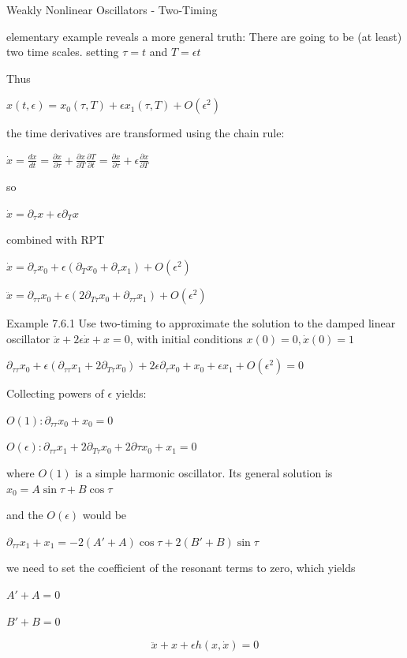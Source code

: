\documentclass[9pt,aspectratio=43,mathserif,table]{beamer}
\begin{document}
\begin{frame}[label=current]{Weakly Nonlinear Oscillators - Two-Timing}
  \begin{multicols}{2}
     elementary example reveals a more general truth: There are going to be (at least) two time scales. setting $\tau = t$ and $T = \epsilon t$

     Thus

     $x(t, \epsilon) = x_0 (\tau, T) + \epsilon x_1(\tau, T) + O(\epsilon^2)$

     the time derivatives are transformed using the chain rule:

     $\dot x = \frac{ dx}{dt} = \frac{ \partial x}{\partial \tau} + \frac{ \partial x}{\partial T} \frac{ \partial T}{\partial t} =  \frac{ \partial x}{\partial \tau} + \epsilon  \frac{ \partial x}{\partial T} $

     so

     $\dot x = \partial_\tau x + \epsilon \partial_T x$

     combined with RPT

     $\dot x = \partial_\tau x_0 + \epsilon (\partial_T x_0 + \partial_\tau x_1) + O(\epsilon^2)$

     $\ddot x = \partial_{\tau\tau} x_0 + \epsilon (2\partial_{T\tau} x_0 + \partial_{\tau\tau} x_1) + O(\epsilon^2)$

     \medskip

     Example 7.6.1 Use two-timing to approximate the solution to the damped linear oscillator 
     $\ddot x + 2 \epsilon \dot x + x = 0$, with initial conditions $x(0) = 0, \dot x(0) = 1$

     $\partial_{\tau\tau} x_0 + \epsilon(\partial_{\tau\tau}x_1 + 2\partial_{T\tau}x_0) + 2 \epsilon \partial_\tau x_0 + x_0 + \epsilon x_1 + O(\epsilon^2) = 0$

     Collecting powers of $\epsilon$ yields:

     $O(1): \partial_{\tau\tau} x_0 + x_0 = 0$

     $O(\epsilon): \partial_{\tau\tau} x_1 + 2\partial_{T\tau}x_0 + 2\partial\tau x_0 + x_1 = 0$

     where $O(1)$ is a simple harmonic oscillator. Its general solution is 
     $x_0 = A \sin \tau + B \cos \tau$

     and the $O(\epsilon)$ would be

     $\partial_{\tau\tau} x_1 + x_1 = -2 (A' + A)\cos \tau + 2(B' + B) \sin \tau$

     we need to set the coefficient of the resonant terms to zero, which yields

     $A' + A = 0$

     $B' + B = 0$


     $$\ddot x + x + \epsilon h(x, \dot x) = 0$$
  \end{multicols}
\end{frame}
\end{document}
